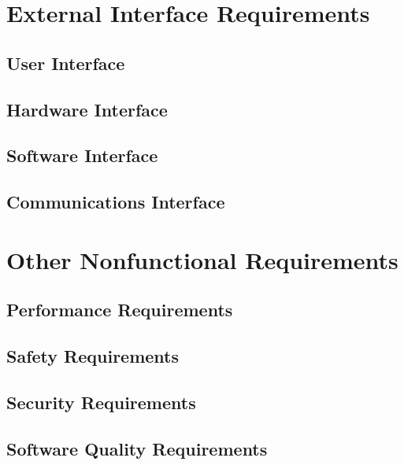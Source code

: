\documentclass{article}
\begin{document}
\section{External Interface Requirements}
\subsection{User Interface}
\subsection{Hardware Interface}
\subsection{Software Interface}
\subsection{Communications Interface}

\section{Other Nonfunctional Requirements}
\subsection{Performance Requirements}
\subsection{Safety Requirements}
\subsection{Security Requirements}
\subsection{Software Quality Requirements}
\end{document}
